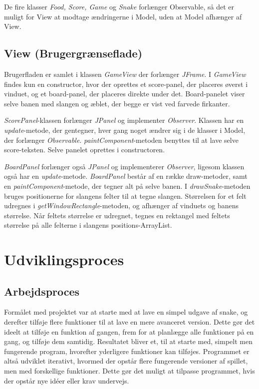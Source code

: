 \documentclass{report}
\begin{document}
De fire klasser \textit{Food, Score, Game} og \textit{Snake} forlænger Observable, så det er muligt for View at modtage ændringerne i Model, uden at Model afhænger af View.

\subsection{View (Brugergrænseflade)}
Brugerfladen er samlet i klassen \textit{GameView} der forlænger \textit{JFrame}. I \textit{GameView} findes kun en constructor, hvor der oprettes et score-panel, der placeres øverst i vinduet, og et board-panel, der placeres direkte under det. Board-panelet viser selve banen med slangen og æblet, der begge er vist ved farvede firkanter. 

\textit{ScorePanel}-klassen forlænger \textit{JPanel} og implementer \textit{Observer}. Klassen har en \textit{update}-metode, der gentegner, hver gang noget ændrer sig i de klasser i Model, der forlænger \textit{Observable}. 
\textit{paintComponent}-metoden benyttes til at lave selve score-teksten. Selve panelet oprettes i constructoren.

\textit{BoardPanel} forlænger også \textit{JPanel} og implementerer \textit{Observer}, ligesom klassen også har en \textit{update}-metode. \textit{BoardPanel} består af en række draw-metoder, samt en \textit{paintComponent}-metode, der tegner alt på selve banen.
I \textit{drawSnake}-metoden bruges positionerne for slangens felter til at tegne slangen. Størrelsen for et felt udregnes i \textit{getWindowRectangle}-metoden, og afhænger af vinduets og banens størrelse. Når feltets størrelse er udregnet, tegnes en rektangel med feltets størrelse på alle felterne i slangens positions-ArrayList.

\section{Udviklingsproces}
\subsection{Arbejdsproces}
Formålet med projektet var at starte med at lave en simpel udgave af snake, og derefter tilføje flere funktioner til at lave en mere avanceret version. Dette gør det ideelt at tilføje en funktion af gangen, frem for at planlægge alle funktioner på en gang, og tilføje dem samtidig. Resultatet bliver et, til at starte med, simpelt men fungerende program, hvorefter yderligere funktioner kan tilføjes. Programmet er altså udviklet iterativt, hvormed der opstår flere fungerende versioner af spillet, men med forskellige funktioner. Dette gør det muligt at tilpasse programmet, hvis der opstår nye idéer eller krav undervejs. 
\end{document}
